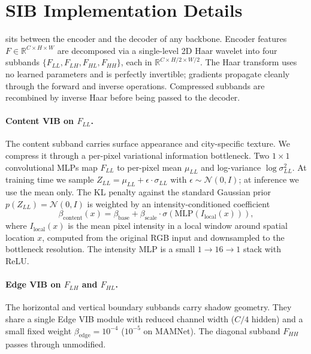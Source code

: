 \section{SIB Implementation Details}
\label{app:sib-impl}

\sib{} sits between the encoder and the decoder of any backbone. Encoder features $F \in \mathbb{R}^{C \times H \times W}$ are decomposed via a single-level 2D Haar wavelet into four subbands $\{F_{LL}, F_{LH}, F_{HL}, F_{HH}\}$, each in $\mathbb{R}^{C \times H/2 \times W/2}$. The Haar transform uses no learned parameters and is perfectly invertible; gradients propagate cleanly through the forward and inverse operations. Compressed subbands are recombined by inverse Haar before being passed to the decoder.

\paragraph{Content VIB on $F_{LL}$.} The content subband carries surface appearance and city-specific texture. We compress it through a per-pixel variational information bottleneck. Two $1{\times}1$ convolutional MLPs map $F_{LL}$ to per-pixel mean $\mu_{LL}$ and log-variance $\log\sigma_{LL}^2$. At training time we sample $Z_{LL} = \mu_{LL} + \epsilon \cdot \sigma_{LL}$ with $\epsilon \sim \mathcal{N}(0,I)$; at inference we use the mean only. The KL penalty against the standard Gaussian prior $p(Z_{LL})=\mathcal{N}(0,I)$ is weighted by an intensity-conditioned coefficient
\begin{equation}
\beta_{\text{content}}(x) = \beta_{\text{base}} + \beta_{\text{scale}} \cdot \sigma\!\left(\text{MLP}(I_{\text{local}}(x))\right),
\end{equation}
where $I_{\text{local}}(x)$ is the mean pixel intensity in a local window around spatial location $x$, computed from the original RGB input and downsampled to the bottleneck resolution. The intensity MLP is a small $1 \to 16 \to 1$ stack with ReLU.

\paragraph{Edge VIB on $F_{LH}$ and $F_{HL}$.} The horizontal and vertical boundary subbands carry shadow geometry. They share a single Edge VIB module with reduced channel width ($C/4$ hidden) and a small fixed weight $\beta_{\text{edge}} = 10^{-4}$ ($10^{-5}$ on MAMNet). The diagonal subband $F_{HH}$ passes through unmodified.

